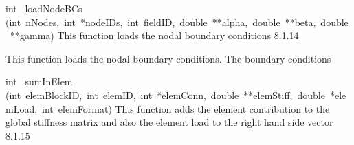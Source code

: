 \documentclass{article}
\begin{document}
\begin{cxxentry}
\begin{cxxentry}
\begin{cxxfunction}
\begin{cxxdoc}
\end{cxxdoc}
\end{cxxfunction}
\begin{cxxfunction}
{int\ }
        {loadNodeBCs}
        {(int\ nNodes,\ int\ *nodeIDs,\ int\ fieldID,\ double\ **alpha,\ double\ **beta,\ double\ **gamma)}
        {
This function loads the nodal boundary conditions}
        {8.1.14}
\begin{cxxdoc}

This function loads the nodal boundary conditions. The boundary conditions

\end{cxxdoc}
\end{cxxfunction}
\begin{cxxfunction}
{int\ }
        {sumInElem}
        {(int\ elemBlockID,\ int\ elemID,\ int\ *elemConn,\ double\ **elemStiff,\ double\ *elemLoad,\ int\ elemFormat)}
        {
This function adds the element contribution to the global stiffness matrix
and also the element load to the right hand side vector
}
        {8.1.15}
\begin{cxxdoc}


\end{cxxdoc}
\end{cxxfunction}
\end{cxxentry}
\end{cxxentry}
\end{document}
